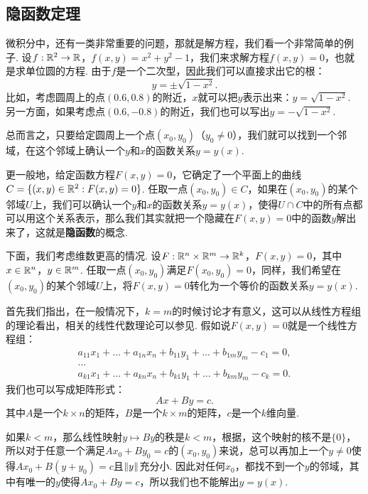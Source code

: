 \subsection{隐函数定理}

微积分中，还有一类非常重要的问题，那就是解方程，我们看一个非常简单的例子. 设$f:\mathbb{R}^2\to\mathbb{R}$，$f(x,y)=x^2+y^2-1$，我们来求解方程$f(x,y)=0$，也就是求单位圆的方程. 由于$f$是一个二次型，因此我们可以直接求出它的根：
    \[y=\pm\sqrt{1-x^2}.\]
比如，考虑圆周上的点$(0.6,0.8)$的附近，$x$就可以把$y$表示出来：$y=\sqrt{1-x^2}$. 另一方面，如果考虑点$(0.6,-0.8)$的附近，我们也可以写出$y=-\sqrt{1-x^2}$. 
    
总而言之，只要给定圆周上一个点$(x_0,y_0)$（$y_0\neq 0$），我们就可以找到一个邻域，在这个邻域上确认一个$y$和$x$的函数关系$y=y(x)$.

更一般地，给定函数方程$F(x,y)=0$，它确定了一个平面上的曲线$C=\{(x,y)\in\mathbb{R}^2:F(x,y)=0\}$. 任取一点$(x_0,y_0)\in C$，如果在$(x_0,y_0)$的某个邻域$U$上，我们可以确认一个$y$和$x$的函数关系$y=y(x)$，使得$U\cap C$中的所有点都可以用这个关系表示，那么我们其实就把一个隐藏在$F(x,y)=0$中的函数$y$解出来了，这就是\textbf{隐函数}的概念.

下面，我们考虑维数更高的情况. 设$F:\mathbb{R}^n\times\mathbb{R}^m\to\mathbb{R}^k$，$F(x,y)=0$，其中$x\in\mathbb{R}^n$，$y\in\mathbb{R}^m$. 任取一点$(x_0,y_0)$满足$F(x_0,y_0)=0$，同样，我们希望在$(x_0,y_0)$的某个邻域$U$上，将$F(x,y)=0$转化为一个等价的函数关系$y=y(x)$. 

首先我们指出，在一般情况下，$k=m$的时候讨论才有意义，这可以从线性方程组的理论看出，相关的线性代数理论可以参见. 假如说$F(x,y)=0$就是一个线性方程组：
\begin{equation}
    \begin{gathered}
        a_{11}x_1+\dots+a_{1n}x_n+b_{11}y_1+\dots+b_{1m}y_m-c_1=0, \\
        \dots \\
        a_{k1}x_1+\dots+a_{kn}x_n+b_{k1}y_1+\dots+b_{km}y_m-c_k=0.
    \end{gathered}
    \label{eq:linear-equation}
\end{equation}
我们也可以写成矩阵形式：
\[Ax+By=c.\]
其中$A$是一个$k\times n$的矩阵，$B$是一个$k\times m$的矩阵，$c$是一个$k$维向量.

如果$k<m$，那么线性映射$y\mapsto By$的秩是$k<m$，根据，这个映射的核不是$\{0\}$，所以对于任意一个满足$Ax_0+By_0=c$的$(x_0,y_0)$来说，总可以再加上一个$y\neq 0$使得$Ax_0+B(y+y_0)=c$且$\left\|y\right\|$充分小. 因此对任何$x_0$，都找不到一个$y$的邻域，其中有唯一的$y$使得$Ax_0+By=c$，所以我们也不能解出$y=y(x)$.


